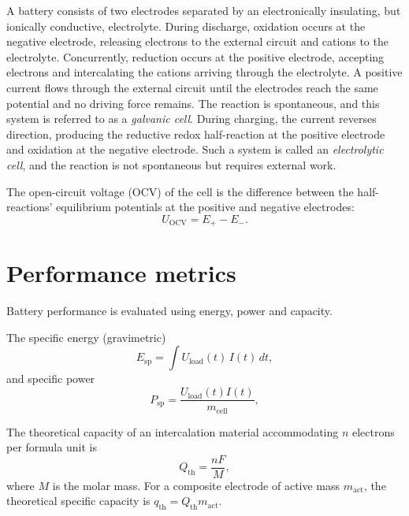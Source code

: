 A battery consists of two electrodes separated by an electronically insulating, but ionically conductive, electrolyte. 
During discharge, oxidation occurs at the negative electrode, releasing electrons to the external circuit and cations to the electrolyte. 
Concurrently, reduction occurs at the positive electrode, accepting electrons and intercalating the cations arriving through the electrolyte. 
A positive current flows through the external circuit until the electrodes reach the same potential and no driving force remains.
The reaction is spontaneous, and this system is referred to as a \emph{galvanic cell}. 
During charging, the current reverses direction, producing the reductive redox half-reaction at the positive electrode and oxidation at the negative electrode.
Such a system is called an \emph{electrolytic cell}, and the reaction is not spontaneous but requires external work.

The open-circuit voltage (OCV) of the cell is the difference between the half-reactions' equilibrium potentials at the positive and negative electrodes:
\begin{equation}
    U_{\mathrm{OCV}} = E_+ - E_-.
\end{equation}

\section{Performance metrics}

Battery performance is evaluated using energy, power and capacity.

The specific energy (gravimetric)
\begin{equation}
    E_{\mathrm{sp}} = \int U_{\mathrm{load}}(t)\, I(t)\, dt,
\end{equation}
and specific power
\begin{equation}
    P_{\mathrm{sp}} = \frac{U_{\mathrm{load}}(t) I(t)}{m_{\mathrm{cell}}},
\end{equation}

The theoretical capacity of an intercalation material accommodating $n$ electrons per formula unit is
\begin{equation}
    Q_{\mathrm{th}} = \frac{n F}{M},
\end{equation}
where $M$ is the molar mass. For a composite electrode of active mass $m_{\mathrm{act}}$, the theoretical specific capacity is $q_{\mathrm{th}} = Q_{\mathrm{th}} m_{\mathrm{act}}$.

